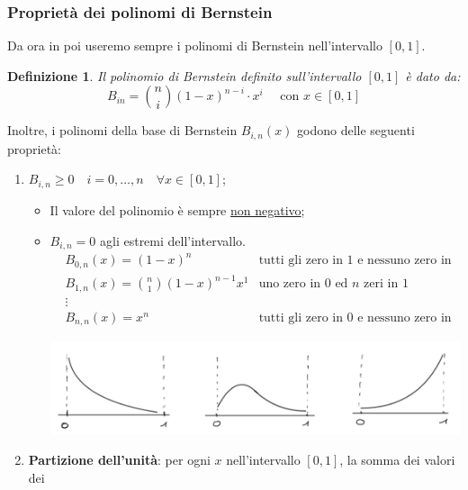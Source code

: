 \documentclass{article}
\newtheorem*{definition}{\color{red}\textbf{Definizione}}
\numberwithin{equation}{section}
\begin{document}
\subsubsection{Proprietà dei polinomi di Bernstein}
Da ora in poi useremo sempre i polinomi di Bernstein nell'intervallo $[0,1]$.
\begin{definition}
    Il polinomio di Bernstein definito sull'intervallo $[0,1]$ è dato da:
    $$B_{in}=\binom{n}{i}(1-x)^{n-i}\cdot x^{i}\quad \text{ con }x\in[0,1]$$
\end{definition}
Inoltre, i polinomi della base di Bernstein $B_{i,n}(x)$ godono delle seguenti
proprietà:
\begin{enumerate}
    \item $B_{i,n}\geq0\quad i=0,\ldots,n\quad \forall x\in[0,1]$;
        \begin{itemize}
            \item Il valore del polinomio è sempre \underline{non negativo};
            \item $B_{i,n}=0$ agli estremi dell'intervallo.
                \begin{equation*}
                   \begin{aligned}
                       & B_{0,n}(x)=(1-x)^n &\text{tutti gli zero in 1 e
                       nessuno zero in 0}\\
                       & B_{1,n}(x)=\binom{n}{1}(1-x)^{n-1}x^1 & \text{uno
                       zero in 0 ed $n$ zeri in 1}\\
                       & \vdots \\
                       & B_{n,n}(x)=x^n & \text{tutti gli zero in 0 e
                       nessuno zero in 1}
                   \end{aligned} 
                \end{equation*}
                \begin{center}
                    \includegraphics[width=0.8\linewidth]{bernstein_zeros}
                \end{center}
        \end{itemize}
    \item \textbf{Partizione dell'unità}:
        per ogni $x$ nell'intervallo $[0,1]$, la somma dei valori dei

\end{enumerate}
\end{document}
